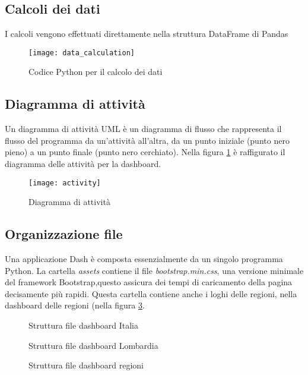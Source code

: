 \subsection{Calcoli dei dati}
I calcoli vengono effettuati direttamente nella struttura DataFrame di Pandas
\begin{figure}[htp]
    \centering
    \texttt{[image: data\_calculation]}
    \caption{Codice Python per il calcolo dei dati}
\end{figure}

\subsection{Diagramma di attività}
Un diagramma di attività UML è un diagramma di flusso che rappresenta il flusso del programma da un'attività all'altra, da un punto iniziale (punto nero pieno) a un punto finale (punto nero cerchiato).
Nella figura \ref{fig:activity} è raffigurato il diagramma delle attività per la dashboard.
\begin{figure}[htp]
    \centering
    \texttt{[image: activity]}
    \caption{Diagramma di attività}
    \label{fig:activity}
\end{figure}

\subsection{Organizzazione file}
Una applicazione Dash è composta essenzialmente da un singolo programma Python.
La cartella \emph{assets} contiene il file \emph{bootstrap.min.css}, una versione minimale del framework Bootstrap,\footnotemark questo assicura dei tempi di caricamento della pagina decisamente più rapidi.
Questa cartella contiene anche i loghi delle regioni, nella dashboard delle regioni (nella figura \ref{fig:tree_regioni}.

\begin{figure}
\centering
\begin{minipage}{.3\linewidth}
\caption{Struttura file dashboard Italia}
\label{fig:tree_italia}
\end{minipage}\hfill
\begin{minipage}{.3\linewidth}
\caption{Struttura file dashboard Lombardia}
\label{fig:tree_lombardia}
\end{minipage}
\end{figure}
\begin{figure}
\centering
\begin{minipage}{.3\linewidth}
\caption{Struttura file dashboard regioni}
\label{fig:tree_regioni}
\end{minipage}\hfill
\end{figure}

